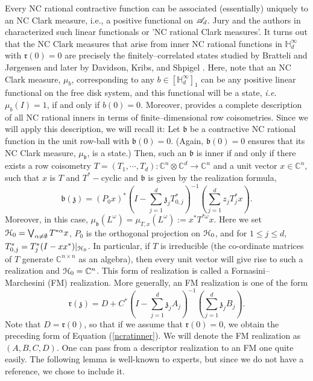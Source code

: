 \documentclass{article}
\theoremstyle{definition}
\theoremstyle{remark}
\numberwithin{equation}{section}
\newcommand{\be}{\begin{equation}}
\newcommand{\ee}{\end{equation}}
\newcommand{\scr}{\ensuremath{\mathscr}}
\newcommand{\om}{\ensuremath{\omega}}
\def\C{\mathbb{C}}
\def\fr{\mathfrak{r}}
\def\fb{\mathfrak{b}}
\def\mult{\mathbb{H} ^\infty _d}
\begin{document}
Every NC rational contractive function can be associated (essentially) uniquely to an NC Clark measure, i.e., a positive functional on $\scr{A}_d$. Jury and the authors in \cite{JMS-ncratClark} characterized such linear functionals or 'NC rational Clark measures'. It turns out that the NC Clark measures that arise from inner NC rational functions in $\mult$ with $\fr(0) = 0$ are precisely the finitely--correlated states studied by Bratteli and J\o rgensen \cite{BraJorg} and later by Davidson, Kribs, and Shpigel \cite{DKS-finrow}. Here, note that an NC Clark measure, $\mu _b$, corresponding to any $b \in [ \mult ] _1$ can be any positive linear functional on the free disk system, and this functional will be a state, \emph{i.e.} $\mu _b (I ) =1$, if and only if $b(0) =0$. Moreover, \cite[Theorem 4.1]{JMS-ncratClark} provides a complete description of all NC rational inners in terms of finite--dimensional row coisometries. Since we will apply this description, we will recall it: Let $\fb$ be a contractive NC rational function in the unit row-ball with $\fb (0) = 0$. (Again, $\fb (0) =0$ ensures that its NC Clark measure, $\mu _\fb$, is a state.) Then, such an $\fb$ is inner if and only if there exists a row coisometry $T = (T_1,\cdots,T_d) \colon \C^n \otimes \C^d \to \C^n$ and a unit vector $x \in \C^n$, such that $x$ is $T$ and $T^*-$cyclic and $\fb$ is given by the realization formula,  
\be
\fb(\mathfrak{z}) = (P_0 x)^* \left( I - \sum_{j=1}^d \mathfrak{z}_j T_{0,j}^* \right)^{-1} \left( \sum_{j=1}^d z_j T_j^*x \right). \label{ncratinner}
\ee
Moreover, in this case, $\mu _\fb (L^\om ) = \mu _{T,x} (L ^\om ) := x^* T^{*\om} x$.
Here we set ${\mathcal H}_0 = \bigvee_{\alpha \neq \emptyset} T^{* \alpha} x$, $P_0$ is the orthogonal projection on ${\mathcal H}_0$, and for $1 \leq j \leq d$, $T_{0,j}^* = T_j^*(I - x x^*)|_{{\mathcal H}_0}$. In particular, if $T$ is irreducible (the co-ordinate matrices of $T$ generate $\C ^{n\times n}$ as an algebra), then every unit vector will give rise to such a realization and $\cH_0 = \C^n$. This form of realization is called a Fornasini--Marchesini (FM) realization. More generally, an FM realization is one of the form 
\[
\fr(\mathfrak{z}) = D + C^*\left(I - \sum_{j=1}^d \mathfrak{z}_j A_j \right)^{-1} \left(\sum_{j=1}^d \mathfrak{z}_j B_j\right).
\]
Note that $D = \fr(0)$, so that if we assume that $\fr(0) = 0$, we obtain the preceding form of Equation (\ref{ncratinner}). We will denote the FM realization as $(A,B,C,D)$. One can pass from a descriptor realization to an FM one quite easily. The following lemma is well-known to experts, but since we do not have a reference, we chose to include it.
\end{document}
